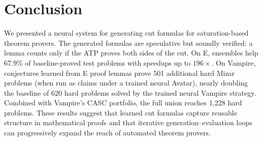 \documentclass{easychair}
\newcommand{\Eprover}{E\xspace}
\newcommand{\Vampire}{Vampire\xspace}
\newcommand{\Mizar}{Mizar\xspace}
\begin{document}
\section{Conclusion}

We presented a neural system for generating cut formulas for
saturation-based theorem provers.  The generated formulas are
speculative but soundly verified: a lemma counts only if the ATP
proves both sides of the cut.  On \Eprover, ensembles help 67.9\%
of baseline-proved test problems with speedups up to $196\times$.
On \Vampire, conjectures learned from \Eprover proof lemmas prove
501 additional hard \Mizar problems (when run as claims under a trained neural Avatar),
nearly doubling the baseline of 620 hard problems
solved by the trained neural \Vampire strategy.  Combined with \Vampire's CASC portfolio, the full union
reaches 1,228 hard problems.  These results suggest that learned cut formulas capture
reusable structure in mathematical proofs and that iterative
generation--evaluation loops can progressively expand the reach of
automated theorem provers.
\end{document}
